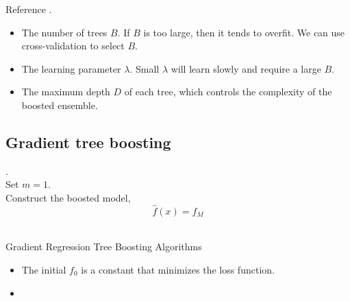 \begin{refsection}
\begin{remark}
	Reference \cite[322]{james2013introduction}.
\end{remark}

\begin{remark}\hfill
	\begin{itemize}
		\item The number of trees $B$. If $B$ is too large, then it tends to overfit. We can use cross-validation to select $B$.
		\item The learning parameter $\lambda$. Small $\lambda$ will learn slowly and require a large $B$.
		\item The maximum depth $D$ of each tree, which controls the complexity of the boosted ensemble.  
	\end{itemize}
\end{remark}



\subsection{Gradient tree boosting }

\begin{algorithm}[H]
	\SetAlgoLined
	.\\
	Set $m = 1$. \\
	Construct the boosted model,
	$$\hat{f}(x) = f_M$$\\
	\caption{Gradient Regression Tree Boosting Algorithms}
\end{algorithm}


\begin{remark}[interpretation]\hfill
	\begin{itemize}
		\item The initial $f_0$ is a constant that minimizes the loss function.
		\item 
	\end{itemize}
\end{remark}



\end{refsection}
